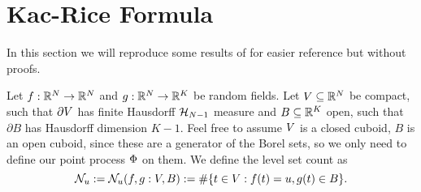 \section{Kac-Rice Formula}

In this section we will reproduce some results of
\textcite{adlerRandomFieldsGeometry2007} for easier reference but without
proofs.

Let \(f:\mathbb{R}^N\to\mathbb{R}^N\) and \(g:\mathbb{R}^N\to\mathbb{R}^K\)
be random fields. Let \(V\subseteq \mathbb{R}^N\) be compact,
such that \(\partial V\) has finite Hausdorff \(\mathcal{H}_{N-1}\)
measure and \(B\subseteq \mathbb{R}^K\) open, such that \(\partial B\) has Hausdorff
dimension \(K-1\).
Feel free to assume \(V\) is a closed cuboid, \(B\) is an open cuboid, since
these are a generator of the Borel sets, so we only need to define our point
process \(\Phi\) on them.
We define the level set count as
\[
	\mathcal{N}_{u}:= \mathcal{N}_{u}(f, g: V, B) := \#\{t\in V : f(t) = u, g(t)\in B\}.
\]
